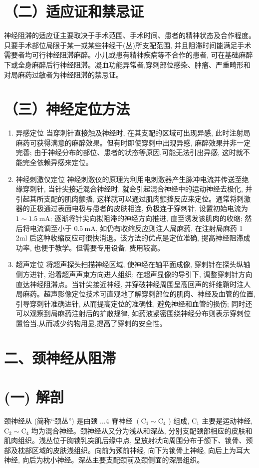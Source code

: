 \documentclass[10pt]{article}
\begin{document}
\section*{（二）适应证和禁忌证}
神经阻滞的适应证主要取决于手术范围、手术时间、患者的精神状态及合作程度。只要手术部位局限于某一或某些神经干(丛)所支配范围, 并且阻滞时间能满足手术需要者均可行神经阻滞麻醉。小儿或患有精神疾病等不合作的患者, 可在基础麻醉下或全身麻醉后行神经阻滞。凝血功能异常者,穿刺部位感染、肿瘤、严重畸形和对局麻药过敏者为神经阻滞的禁忌证。

\section*{（三）神经定位方法}
\begin{enumerate}
  \item 异感定位 当穿刺针直接触及神经时, 在其支配的区域可出现异感, 此时注射局麻药可获得满意的麻醉效果。但有时即使穿刺中出现异感, 麻醉效果并非一定完善; 由于神经分布的部位、患者的状态等原因,可能无法引出异感, 这时就不能完全依赖异感来定位。

  \item 神经刺激仪定位 神经刺激仪的原理为利用电刺激器产生脉冲电流并传送至绝缘穿刺针, 当针尖接近混合神经时, 就会引起混合神经中的运动神经去极化, 并引起其所支配的肌肉颤搐, 这样就可以通过肌肉颤搐反应来定位。通常将刺激器的正极通过表面电极与患者的皮肤相连, 负极连于穿刺针, 设置初始电流为 $1 \sim 1.5 \mathrm{~mA}$; 逐渐将针尖向拟阻滞的神经方向推进, 直至诱发该肌肉的收缩; 然后将电流调至小于 $0.5 \mathrm{~mA}$, 如仍有收缩反应则注人局麻药, 在注射局麻药 1 2ml 后这种收缩反应可很快消退。该方法的优点是定位准确, 提高神经阻滞成功率, 也便于教学。但需要专用设备, 费用较高。

  \item 超声定位 将超声探头扫描神经区域, 使神经在轴平面成像, 穿刺针在探头纵轴侧方进针, 沿着超声声束方向进人组织; 在超声显像的导引下, 调整穿刺针方向直达神经阻滞点。当针尖接近神经, 并穿破神经周围呈高回声的纤维鞘时注人局麻药。超声影像定位技术可直观地了解穿刺部位的肌肉、神经及血管的位置, 引导穿刺针准确进针, 从而提高定位的准确性, 避免神经和血管的损伤; 同时还可以观察到局麻药注射后的扩散规律, 如药液紧密围绕神经分布则表示穿刺位置恰当,从而减少约物用显,提高了穿刺的安全性。

\end{enumerate}

\section*{二、颈神经从阻滞}
\section*{(一) 解剖}
颈神经从 (简称“颈丛”) 是由颈 $\ldots 4$ 脊神经 $\left(\mathrm{C}_{1} \sim \mathrm{C}_{4}\right.$ ) 组成, $\mathrm{C}_{1}$ 主要是运动神经, $\mathrm{C}_{2} \sim \mathrm{C}_{4}$ 均为混合神经。颈神经从又分为浅从和深丛, 分别支配颈部相应的皮肤和肌肉组织。浅丛位于胸锁乳突肌后缘中点, 呈放射状向周围分布于颌下、锁骨、颈部及枕部区域的皮肤浅组织。向前为颈前神经, 向下为锁骨上神经, 向后上为耳大神经, 向后为枕小神经。深丛主要支配颈前及颈侧面的深层组织。
\end{document}
